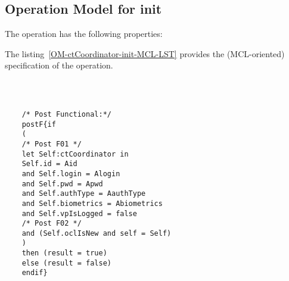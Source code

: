\subsection{Operation Model for init}

\label{OM-init}


The  operation has the following properties:

	\begin{operationmodel}



		


	\end{operationmodel}



	\vspace{1cm}
	The listing~\ref{OM-ctCoordinator-init-MCL-LST} provides the \msrmessir (MCL-oriented) specification of the operation.
	
	\scriptsize
	\vspace{0.5cm}
	\begin{lstlisting}[style=MessirStyle,firstnumber=auto,captionpos=b,caption={\msrmessir (MCL-oriented) specification of the operation \emph{init}.},label=OM-ctCoordinator-init-MCL-LST]

	
	
	/* Post Functional:*/ 
	postF{if
	(
	/* Post F01 */
	let Self:ctCoordinator in
	Self.id = Aid
	and Self.login = Alogin
	and Self.pwd = Apwd
	and Self.authType = AauthType
	and Self.biometrics = Abiometrics
	and Self.vpIsLogged = false
	/* Post F02 */
	and (Self.oclIsNew and self = Self)
	)
	then (result = true)
	else (result = false)
	endif}
	
	
	\end{lstlisting}
	\normalsize 
	
	
	
	





